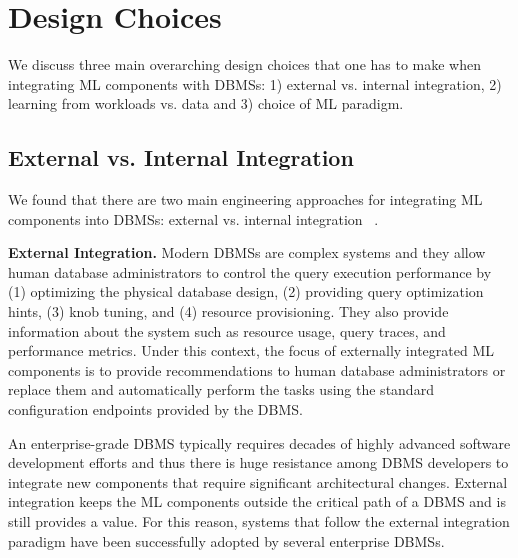 \section{Design Choices}

We discuss three main overarching design choices that one has to make when integrating ML components with DBMSs: 1) external vs. internal integration, 2)  learning from workloads vs. data and 3) choice of ML paradigm.


\subsection{External vs. Internal Integration}
We found that there are two main engineering approaches for integrating ML components into DBMSs: external vs. internal integration ~\cite{pavlo2019external}.

\vspace{2mm}
\noindent \textbf{External Integration.} Modern DBMSs are complex systems and they allow human database administrators to control the query execution performance by (1) optimizing the physical database design, (2) providing query optimization hints, (3) knob tuning, and (4) resource provisioning.
They also provide information about the system such as resource usage, query traces, and performance metrics.
Under this context, the focus of externally integrated ML components is to provide recommendations to human database administrators or replace them and automatically perform the tasks using the standard configuration endpoints provided by the DBMS.

An enterprise-grade DBMS typically requires decades of highly advanced software development efforts and thus there is huge resistance among DBMS developers to integrate new components that require significant architectural changes.
External integration keeps the ML components outside the critical path of a DBMS and is still provides a value.
For this reason, systems that follow the external integration paradigm have been successfully adopted by several enterprise DBMSs.

